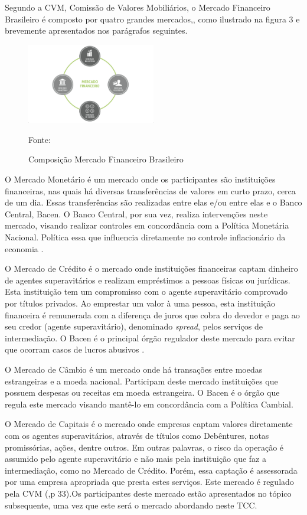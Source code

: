 Segundo a CVM, Comissão de Valores Mobiliários, o Mercado Financeiro Brasileiro é composto por quatro grandes mercados,\cite[p. 15]{cmv2014}, como ilustrado na figura 3 e brevemente apresentados nos parágrafos seguintes.

\begin{figure}[h!]
\centering
\label{f01}
\includegraphics[width=0.5\textwidth]{figuras/f01}
\caption{Composição Mercado Financeiro Brasileiro} {Fonte:\cite{cvm2014}}

\end{figure}

O Mercado Monetário é um mercado onde os participantes são instituições financeiras, nas quais há diversas transferências de valores em curto prazo, cerca de um dia. Essas transferências são realizadas entre elas e/ou entre elas e o Banco Central, Bacen. O Banco Central, por sua vez, realiza intervenções neste mercado, visando realizar controles em concordância com a Política Monetária Nacional. Política essa que influencia diretamente no controle inflacionário da economia \cite[p. 32]{cmv2014}.

O Mercado de Crédito é o mercado onde instituições financeiras captam dinheiro de agentes superavitários e realizam empréstimos a pessoas físicas ou jurídicas. Esta instituição tem um compromisso com o agente superavitário comprovado por títulos privados. Ao emprestar um valor à uma pessoa, esta instituição financeira é remunerada com a diferença de juros que cobra do devedor e paga ao seu credor (agente superavitário), denominado \textit{spread}, pelos serviços de intermediação. O Bacen é o principal órgão regulador deste mercado para evitar que ocorram casos de lucros abusivos \cite[p. 32]{cmv2014}.

O Mercado de Câmbio é um mercado onde há transações entre moedas estrangeiras e a moeda nacional. Participam deste mercado instituições que possuem despesas ou receitas em moeda estrangeira. O Bacen é o órgão que regula este mercado visando mantê-lo em concordância com a Política Cambial\cite[p. 32]{cmv2014}.

O Mercado de Capitais é o mercado onde empresas captam valores diretamente com os agentes superavitários, através de títulos como Debêntures, notas promissórias, ações, dentre outros. Em outras palavras, o risco da operação é assumido pelo agente superavitário e não mais pela instituição que faz a intermediação, como no Mercado de Crédito. Porém, essa captação é assessorada por uma empresa apropriada que presta estes serviços. Este mercado é regulado pela CVM (\citeyear{cmv2014},p 33).Os participantes deste mercado estão apresentados no tópico subsequente, uma vez que este será o mercado abordando neste TCC.

